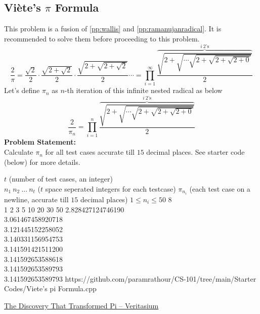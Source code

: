 \documentclass[../../Problems]{subfiles}
\begin{document}
\subsection{Viète's $\pi$ Formula}{\label{pp:vietesformula}}
This problem is a fusion of \ref{pp:wallis} and \ref{pp:ramanujanradical}. It is recommended to solve them before proceeding to this problem.
\begin{equation}
{ {\frac {2}{\pi }}={\frac {\sqrt {2}}{2}}\cdot {\frac {\sqrt {2+{\sqrt {2}}}}{2}}\cdot {\frac {\sqrt {2+{\sqrt {2+{\sqrt {2}}}}}}{2}}\cdots = \prod_{i = 1}^{\infty} \frac{\overbrace{\sqrt{2+\sqrt{\cdots{\sqrt{2+{\sqrt{2+\sqrt{2+0}}}}}}}}^{i\ 2\text{'s}}}{2}}
	\end{equation}
Let's define $\pi_n$ as $n$-th iteration of this infinite nested radical as below
\begin{equation*}
\frac{2}{\pi_n} = \prod_{i = 1}^{n} \frac{\overbrace{\sqrt{2+\sqrt{\cdots{\sqrt{2+{\sqrt{2+\sqrt{2+0}}}}}}}}^{i\ 2\text{'s}}}{2}
\end{equation*}
\textbf{Problem Statement:}\\
Calculate $\pi_n$ for all test cases accurate till $15$ decimal places. See starter code (below) for more details.
\begin{testcases}
	{$t$ \hfill(number of test cases, an integer)\\$n_1\ n_2\ \ldots\ n_t$ \hfill($t$ space seperated integers for each testcase)}
	{$\pi_{n_i}$ \hfill(each test case on a newline, accurate till $15$ decimal places)}
	{$1 \leq n_i \leq 50$}
	{8\\1 2 3 5 10 20 30 50}
	{2.828427124746190\\3.061467458920718\\3.121445152258052\\3.140331156954753\\3.141591421511200\\3.141592653588618\\3.141592653589793\\3.141592653589793}
	{https://github.com/paramrathour/CS-101/tree/main/Starter Codes/Viete's pi Formula.cpp}
\end{testcases}
\begin{funvideo}
\href{https://youtu.be/gMlf1ELvRzc}{The Discovery That Transformed Pi -- Veritasium}
\end{funvideo}
\end{document}
